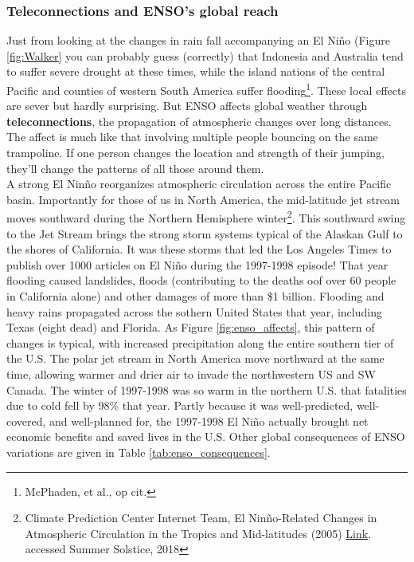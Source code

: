 \documentclass[amstex,12pt]{book}
\begin{document}
{\subsubsection{Teleconnections and ENSO's global reach}
Just from looking at the changes in rain fall accompanying an El Ni\~no (Figure \ref{fig:Walker} you can probably guess (correctly) that Indonesia and Australia tend to suffer severe drought at these times, while the island nations of the central Pacific and counties of western South America suffer flooding\footnote{McPhaden, et al., op cit.}. These local effects are sever but hardly surprising. But ENSO affects global weather through \textbf{teleconnections}, the propagation of atmospheric changes over long distances. The affect is much like that involving multiple people bouncing on the same trampoline. If one person changes the location and strength of their jumping, they'll change the patterns of all those around them.\\
A strong El Nin\~no reorganizes atmospheric circulation across the entire Pacific basin. Importantly for those of us in North America, the mid-latitude jet stream moves southward during the Northern Hemisphere winter\footnote{Climate Prediction Center Internet Team, El Nin\~no-Related Changes in Atmospheric Circulation in the Tropics and Mid-latitudes (2005) \href{http://www.cpc.ncep.noaa.gov/products/analysis_monitoring/ensocycle/enso_circ.shtml}{Link}, accessed Summer Solstice, 2018}. This southward swing to the Jet Stream brings the strong storm systems typical of the Alaskan Gulf to the shores of California. It was these storms that led the Los Angeles Times to publish over 1000 articles on El Ni\~no during the 1997-1998 episode! That year flooding caused landslides, floods (contributing to the deaths oof over 60 people in California alone) and other damages of more than \$1 billion. Flooding and heavy rains propagated across the sothern United States that year, including Texas (eight dead) and Florida. As Figure \ref{fig:enso_affects}, this pattern of changes is typical, with increased precipitation along the entire southern tier of the U.S. The polar jet stream in North America move northward at the same time, allowing warmer and drier air to invade the northwestern US and SW Canada. The winter of 1997-1998 was so warm in the northern U.S. that fatalities due to cold fell by 98\% that year. Partly because it was well-predicted, well-covered, and well-planned for, the 1997-1998 El Ni\~no actually brought net economic benefits and saved lives in the U.S. Other global consequences of ENSO variations are given in Table \ref{tab:enso_consequences}. \\

}
\end{document}
